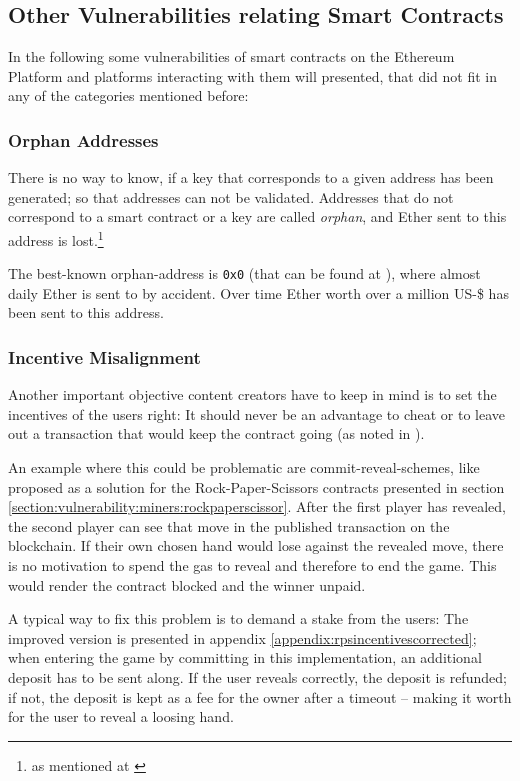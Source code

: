\subsection{Other Vulnerabilities relating Smart Contracts}
In the following some vulnerabilities of smart contracts on the Ethereum Platform and platforms interacting with them will presented, that did not fit in any of the categories mentioned before:

\subsubsection{Orphan Addresses}
There is no way to know, if a key that corresponds to a given address has been generated; so that addresses can not be validated. Addresses that do not correspond to a smart contract or a key are called \textit{orphan}, and Ether sent to this address is lost.\footnote{as mentioned at \cite[Page 11 (Ether lost in transfer)]{atzei:attacksurvey}}

The best-known orphan-address is \texttt{0x0} (that can be found at \cite{etherscan:addresszero}), where almost daily Ether is sent to by accident. Over time Ether worth over a million US-\$ has been sent to this address.

\subsubsection{Incentive Misalignment}
\label{section:other:incentive}
Another important objective content creators have to keep in mind is to set the incentives of the users right: It should never be an advantage to cheat or to leave out a transaction that would keep the contract going (as noted in \cite{delmolino:rps}).

An example where this could be problematic are commit-reveal-schemes, like proposed as a solution for the Rock-Paper-Scissors contracts presented in section \ref{section:vulnerability:miners:rockpaperscissor}. After the first player has revealed, the second player can see that move in the published transaction on the blockchain. If their own chosen hand would lose against the revealed move, there is no motivation to spend the gas to reveal and therefore to end the game. This would render the contract blocked and the winner unpaid.

A typical way to fix this problem is to demand a stake from the users: The improved version is presented in appendix \ref{appendix:rpsincentivescorrected}; when entering the game by committing in this implementation, an additional deposit has to be sent along. If the user reveals correctly, the deposit is refunded; if not, the deposit is kept as a fee for the owner after a timeout -- making it worth for the user to reveal a loosing hand.


